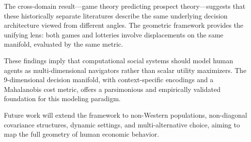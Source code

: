 \documentclass[journal]{IEEEtran}
\begin{document}
The cross-domain result---game theory predicting prospect theory---suggests that these historically separate literatures describe the same underlying decision architecture viewed from different angles.
The geometric framework provides the unifying lens: both games and lotteries involve displacements on the same manifold, evaluated by the same metric.

These findings imply that computational social systems should model human agents as multi-dimensional navigators rather than scalar utility maximizers.
The 9-dimensional decision manifold, with context-specific encodings and a Mahalanobis cost metric, offers a parsimonious and empirically validated foundation for this modeling paradigm.

Future work will extend the framework to non-Western populations, non-diagonal covariance structures, dynamic settings, and multi-alternative choice, aiming to map the full geometry of human economic behavior.


\end{document}
